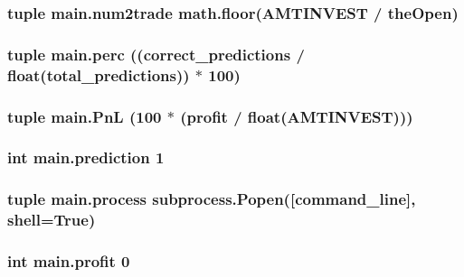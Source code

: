 \hypertarget{namespacemain_a118e0bd8e297ab3304833a9df0cec090}{
\subsubsection[{num2trade}]{\setlength{\rightskip}{0pt plus 5cm}tuple main.\-num2trade math.\-floor(A\-M\-T\-I\-N\-V\-E\-S\-T / {\bf the\-Open})}}\label{namespacemain_a118e0bd8e297ab3304833a9df0cec090}
\hypertarget{namespacemain_ae9fa3f5086214b1a435c317bfeccfe8c}{
\subsubsection[{perc}]{\setlength{\rightskip}{0pt plus 5cm}tuple main.\-perc (({\bf correct\-\_\-predictions} / float({\bf total\-\_\-predictions})) $\ast$ 100)}}\label{namespacemain_ae9fa3f5086214b1a435c317bfeccfe8c}
\hypertarget{namespacemain_a3479b13a7722446bbb0445aea9b4c7d3}{
\subsubsection[{Pn\-L}]{\setlength{\rightskip}{0pt plus 5cm}tuple main.\-Pn\-L (100 $\ast$ ({\bf profit} / float(A\-M\-T\-I\-N\-V\-E\-S\-T)))}}\label{namespacemain_a3479b13a7722446bbb0445aea9b4c7d3}
\hypertarget{namespacemain_a3d86c9a974d908ad52608b11f24df15d}{
\subsubsection[{prediction}]{\setlength{\rightskip}{0pt plus 5cm}int main.\-prediction 1}}\label{namespacemain_a3d86c9a974d908ad52608b11f24df15d}
\hypertarget{namespacemain_a1fafe44ec9b6c9b2b579106b6515eb1e}{
\subsubsection[{process}]{\setlength{\rightskip}{0pt plus 5cm}tuple main.\-process subprocess.\-Popen(\mbox{[}{\bf command\-\_\-line}\mbox{]}, shell=True)}}\label{namespacemain_a1fafe44ec9b6c9b2b579106b6515eb1e}
\hypertarget{namespacemain_a71a9921366b31bec8dfbbdc963039a1a}{
\subsubsection[{profit}]{\setlength{\rightskip}{0pt plus 5cm}int main.\-profit 0}}\label{namespacemain_a71a9921366b31bec8dfbbdc963039a1a}
